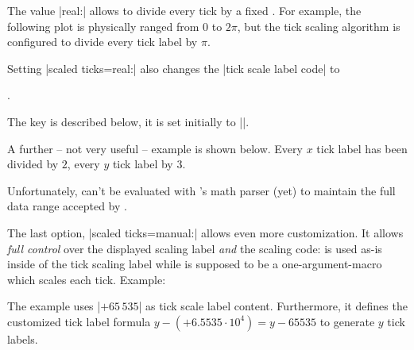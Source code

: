\begin{pgfplotsxykeylist}
	The value |real:| allows to divide every tick by a fixed .
	For example, the following plot is physically ranged from $0$ to $2\pi$, but the tick scaling algorithm is configured to divide every tick label by $\pi$.
\begin{codeexample}[]
\end{codeexample}
	\noindent Setting |scaled ticks=real:| also changes the |tick scale label code| to
\begin{codeexample}
.
\end{codeexample}
\noindent The key  is described below, it is set initially to |\cdot|.

A further -- not very useful -- example is shown below. Every $x$ tick label has been divided by $2$, every $y$ tick label by $3$.
\nobreak
\begin{codeexample}[]
\end{codeexample}

	Unfortunately,  can't be evaluated with \PGF's math parser (yet) to maintain the full data range accepted by \PGFPlots.

	The last option, |scaled ticks=manual:| allows even more customization. It allows \emph{full control} over the displayed scaling label \emph{and} the scaling code:  is used as-is inside of the tick scaling label while  is supposed to be a one-argument-macro which scales each tick. Example:
\begin{codeexample}[]
\end{codeexample}
\noindent The example uses |$+65\,535$| as tick scale label content. Furthermore, it defines the customized tick label formula $y - (+6.5535\cdot 10^4) = y - 65535$ to generate $y$ tick labels.


\end{pgfplotsxykeylist}
